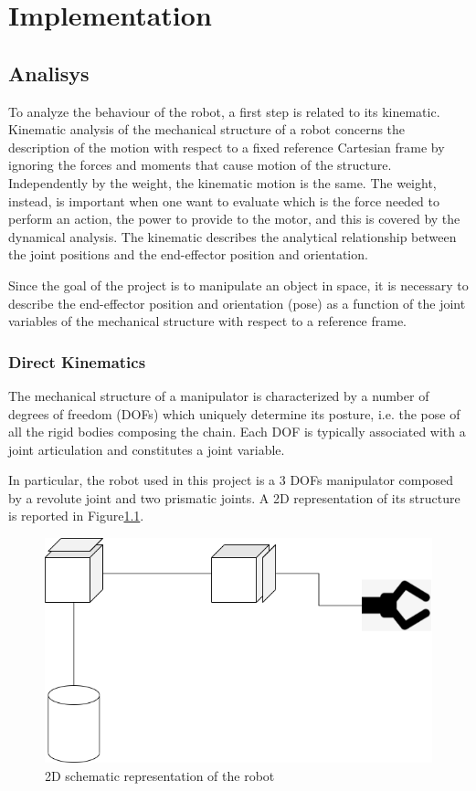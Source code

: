 \chapter{Implementation}

\section{Analisys}
To analyze the behaviour of the robot, a first step is related to its kinematic. Kinematic analysis of the mechanical structure of a robot concerns the description of the motion with respect to a fixed reference Cartesian frame by ignoring the forces and moments that cause motion of the structure. Independently by the weight, the kinematic motion is the same. The weight, instead, is important when one want to evaluate which is the force needed to perform an action, the power to provide to the motor, and this is covered by the dynamical analysis. The kinematic describes the analytical relationship between the joint positions and the end-effector position and orientation.

Since the goal of the project is to manipulate an object in space, it is necessary to describe the end-effector position and orientation (pose) as a function of the joint variables of the mechanical structure with respect to a reference frame.

\subsection{Direct Kinematics}
The mechanical structure of a manipulator is characterized by a number of degrees of freedom (DOFs) which uniquely determine its posture, i.e. the pose of all the rigid bodies composing the chain. Each DOF is typically associated with a joint articulation and constitutes a joint variable.

In particular, the robot used in this project is a 3 DOFs manipulator composed by a revolute joint and two prismatic joints. A 2D representation of its structure is reported in Figure\ref{fig:robot2D}. 

\begin{figure}[!h]
\begin{center}
\includegraphics[width=0.6\linewidth]{capitolo3/figure/2Dmodel.png}
\caption{2D schematic representation of the robot}
\label{fig:robot2D}
\end{center}
\end{figure}

